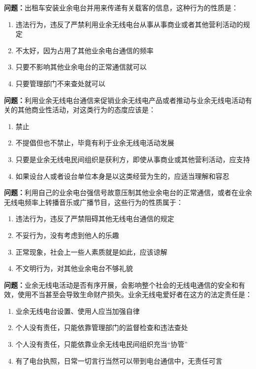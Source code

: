 \bigskip


\noindent\textbf{问题：}出租车安装业余电台并用来传递有关载客的信息，这种行为的性质是：
\begin{enumerate}[label=\Alph*), leftmargin=3em]
\item 违法行为，违反了严禁利用业余无线电台从事从事商业或者其他营利活动的规定
\item 不太好，因为占用了其他业余电台通信的频率
\item 只要不影响其他业余电台的正常通信就可以
\item 只要管理部门不来查处就可以
\end{enumerate}

\bigskip


\noindent\textbf{问题：}利用业余无线电台通信来促销业余无线电产品或者推动与业余无线电活动有关的其他商业性活动，对这类行为的态度应该是：
\begin{enumerate}[label=\Alph*), leftmargin=3em]
\item 禁止
\item 不提倡但也不禁止，毕竟有利于业余无线电活动发展
\item 只要是业余无线电民间组织是获利方，即使从事商业或其他营利活动，应支持
\item 如果设台人或者设台单位本身是以这类经营为生的，应适当理解和容忍
\end{enumerate}

\bigskip


\noindent\textbf{问题：}利用自己的业余电台强信号故意压制其他业余电台的正常通信，或者在业余无线电频率上转播音乐或广播节目，这些行为的性质属于：
\begin{enumerate}[label=\Alph*), leftmargin=3em]
\item 违法行为，违反了严禁阻碍其他无线电台通信的规定
\item 不妥行为，没有考虑到他人的乐趣
\item 正常现象，社会上一些人素质就是如此，应该谅解
\item 不文明行为，对其他业余电台不够礼貌
\end{enumerate}

\bigskip


\noindent\textbf{问题：}业余无线电活动是否有序开展，会影响整个社会的无线电通信的安全和有效，使用不当甚至会导致生命财产损失。业余无线电爱好者在这方的法定责任是：
\begin{enumerate}[label=\Alph*), leftmargin=3em]
\item 业余无线电台设置、使用人应当加强自律
\item 个人没有责任，只能依靠管理部门的监督检查和违法查处
\item 个人没有责任，只能依靠业余无线电民间组织充当“协管”
\item 有了电台执照，日常一切言行当然可以带到电台通信中，无责任可言
\end{enumerate}

